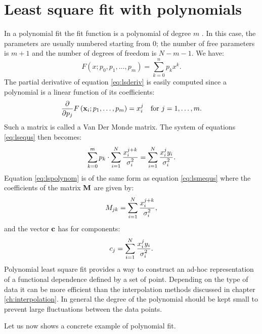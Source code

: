 \documentclass[twoside]{book}
\begin{document}
\section{Least square fit with polynomials}
\label{sec:lsfpol} In a polynomial fit the fit function is a
polynomial of degree $m$ . In this case, the parameters are
usually numbered starting from 0; the number of free parameters is
$m+1$ and the number of degrees of freedom is $N-m-1$. We have:
\begin{equation}
F\left(x;p_0,p_1,\ldots,p_m\right)=\sum_{k=0}^n p_k x^k.
\end{equation}
The partial derivative of equation \ref{eq:lsderiv} is easily
computed since a polynomial is a linear function of its
coefficients:
\begin{equation}
  {\displaystyle \partial\over\displaystyle\partial p_j}
  F\left({\bf x}_i;p_1,\ldots,p_m\right)=x_i^j\mbox{\quad for
  $j=1,\ldots,m$}.
\end{equation}
Such a matrix is called a Van Der Monde matrix. The system of
equations \ref{eq:lsequs} then becomes:
\begin{equation}
\label{eq:lspolynom}
 \sum_{k=0}^m p_k\cdot\sum_{i=1}^N{\displaystyle
x_i^{j+k}\over\displaystyle\sigma_i^2} =\sum_{i=1}^N{\displaystyle
x_i^j y_i\over\displaystyle\sigma_i^2}.
\end{equation}
Equation \ref{eq:lspolynom} is of the same form as equation
\ref{eq:lsmequs} where the coefficients of the matrix ${\bf M}$
are given by:
\begin{equation}
M_{jk}=\sum_{i=1}^N {\displaystyle
x_i^{j+k}\over\displaystyle\sigma_i^2},
\end{equation}
and the vector ${\bf c}$ has for components:
\begin{equation}
c_j =\sum_{i=1}^N{\displaystyle x_i^j
y_i\over\displaystyle\sigma_i^2}.
\end{equation}
Polynomial least square fit provides a way to construct an ad-hoc
representation of a functional dependence defined by a set of
point. Depending on the type of data it can be more efficient than
the interpolation methods discussed in chapter
\ref{ch:interpolation}. In general the degree of the polynomial
should be kept small to prevent large fluctuations between the
data points.

\noindent Let us now shows a concrete example of polynomial fit.
\end{document}
